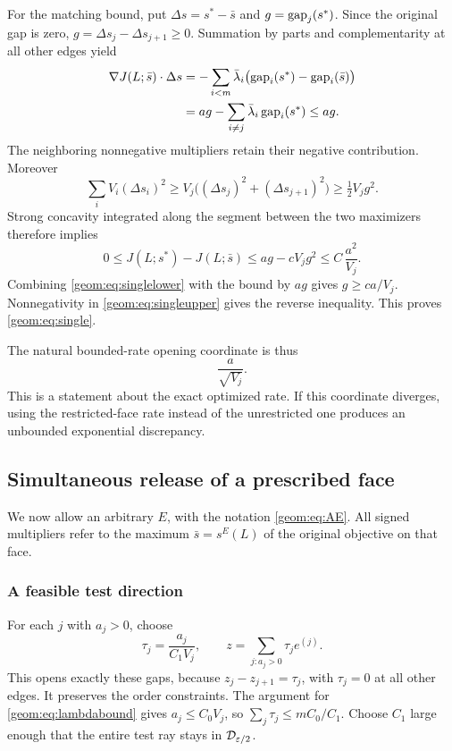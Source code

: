 For the matching bound, put \(\Delta s=s^*-\bar s\) and
\(g=\operatorname{gap}_j(s^*)\).  Since the original gap is zero,
\(g=\Delta s_j-\Delta s_{j+1}\ge0\).  Summation by parts and
complementarity at all other edges yield
\begin{align}
 \nabla J(L;\bar s)\cdot\Delta s
  &=-\sum_{i<m}\bar\lambda_i
                  \bigl(\operatorname{gap}_i(s^*)-\operatorname{gap}_i(\bar s)\bigr)\nonumber\\
  &=ag-\sum_{i\ne j}\bar\lambda_i\operatorname{gap}_i(s^*)\le ag.
                                                        \label{geom:eq:singlelinear}
\end{align}
The neighboring nonnegative multipliers retain their negative
contribution.
Moreover
\[
 \sum_iV_i(\Delta s_i)^2
 \ge V_j\bigl((\Delta s_j)^2+(\Delta s_{j+1})^2\bigr)
 \ge \tfrac12V_jg^2.
\]
Strong concavity integrated along the segment between the two
maximizers therefore implies
\begin{equation}
 0\le J(L;s^*)-J(L;\bar s)
       \le ag-cV_jg^2\le C\,\frac{a^2}{V_j}.      \label{geom:eq:singleupper}
\end{equation}
Combining \eqref{geom:eq:singlelower} with the bound by \(ag\) gives
\(g\ge ca/V_j\).  Nonnegativity in \eqref{geom:eq:singleupper} gives the
reverse inequality.  This proves \eqref{geom:eq:single}.

The natural bounded-rate opening coordinate is thus
\[
 \frac{a}{\sqrt{V_j}}.
\]
This is a statement about the exact optimized rate.  If this coordinate
diverges, using the restricted-face rate instead of the unrestricted
one produces an unbounded exponential discrepancy.

\subsection{Simultaneous release of a prescribed face}

We now allow an arbitrary \(E\), with the notation
\eqref{geom:eq:AE}.  All signed multipliers refer to the maximum
\(\bar s=s^E(L)\) of the original objective on that face.

\subsubsection{A feasible test direction}

For each \(j\) with \(a_j>0\), choose
\[
 \tau_j=\frac{a_j}{C_1V_j},\qquad
 z=\sum_{j:a_j>0}\tau_j e^{(j)}.
\]
This opens exactly these gaps, because
\(z_j-z_{j+1}=\tau_j\), with \(\tau_j=0\) at all other edges.
It preserves the order constraints.  The argument for
\eqref{geom:eq:lambdabound} gives \(a_j\le C_0V_j\), so
\(\sum_j\tau_j\le mC_0/C_1\).  Choose \(C_1\) large enough that
the entire test ray stays in \(\mathcal D_{\varepsilon/2}\).

